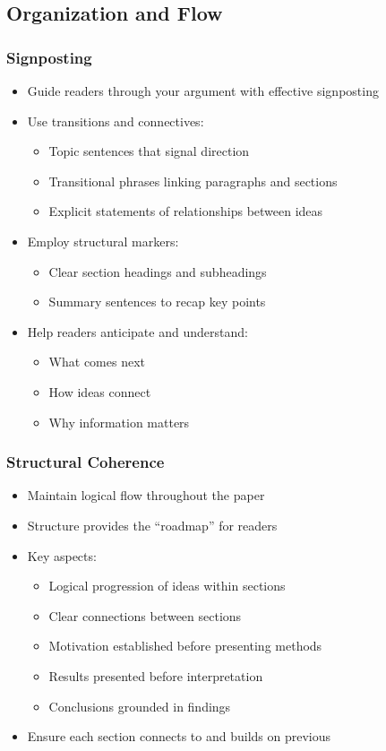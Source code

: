 \documentclass{beamer}
\begin{document}
\subsection{Organization and Flow}

\begin{frame}
  \frametitle{Signposting}
  \begin{itemize}
    \item Guide readers through your argument with effective signposting
    \item Use transitions and connectives:
    \begin{itemize}
      \item Topic sentences that signal direction
      \item Transitional phrases linking paragraphs and sections
      \item Explicit statements of relationships between ideas
    \end{itemize}
    \item Employ structural markers:
    \begin{itemize}
      \item Clear section headings and subheadings
      \item Summary sentences to recap key points
    \end{itemize}
    \item Help readers anticipate and understand:
    \begin{itemize}
      \item What comes next
      \item How ideas connect
      \item Why information matters
    \end{itemize}
  \end{itemize}
\end{frame}

\begin{frame}
  \frametitle{Structural Coherence}
  \begin{itemize}
    \item Maintain logical flow throughout the paper
    \item Structure provides the ``roadmap'' for readers
    \item Key aspects:
    \begin{itemize}
      \item Logical progression of ideas within sections
      \item Clear connections between sections
      \item Motivation established before presenting methods
      \item Results presented before interpretation
      \item Conclusions grounded in findings
    \end{itemize}
    \item Ensure each section connects to and builds on previous
  \end{itemize}
\end{frame}
\end{document}
